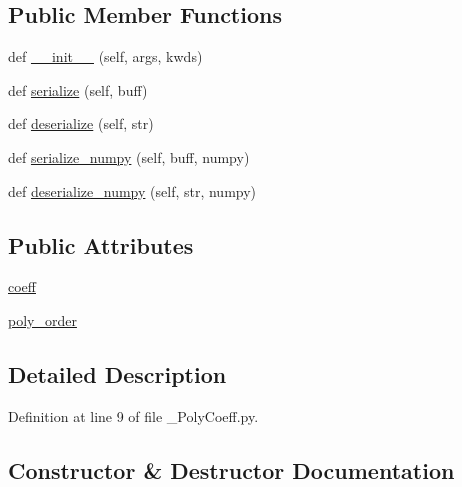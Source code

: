 \subsection*{Public Member Functions}
\begin{DoxyCompactItemize}
\item 
def \hyperlink{classtraj__gen_1_1msg_1_1___poly_coeff_1_1_poly_coeff_a8603ed63ae98eb4fa6e22cf277755d20}{\+\_\+\+\_\+init\+\_\+\+\_\+} (self, args, kwds)
\item 
def \hyperlink{classtraj__gen_1_1msg_1_1___poly_coeff_1_1_poly_coeff_a43b55f036a24b72fb5d2d09e3cf0d514}{serialize} (self, buff)
\item 
def \hyperlink{classtraj__gen_1_1msg_1_1___poly_coeff_1_1_poly_coeff_a6330fc504e43f13f39456ad23f82aa6a}{deserialize} (self, str)
\item 
def \hyperlink{classtraj__gen_1_1msg_1_1___poly_coeff_1_1_poly_coeff_abb0bd3fb8217755c2329e841ce821945}{serialize\+\_\+numpy} (self, buff, numpy)
\item 
def \hyperlink{classtraj__gen_1_1msg_1_1___poly_coeff_1_1_poly_coeff_a903b6433bbedef2e94c4bcebe8184da6}{deserialize\+\_\+numpy} (self, str, numpy)
\end{DoxyCompactItemize}
\subsection*{Public Attributes}
\begin{DoxyCompactItemize}
\item 
\hyperlink{classtraj__gen_1_1msg_1_1___poly_coeff_1_1_poly_coeff_ad71620c7b780397c958dd665c5e0fee1}{coeff}
\item 
\hyperlink{classtraj__gen_1_1msg_1_1___poly_coeff_1_1_poly_coeff_a9a05bcf612b3bf2add175c6167faced5}{poly\+\_\+order}
\end{DoxyCompactItemize}


\subsection{Detailed Description}


Definition at line 9 of file \+\_\+\+Poly\+Coeff.\+py.



\subsection{Constructor \& Destructor Documentation}
